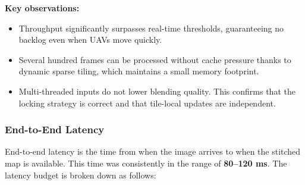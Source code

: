 \documentclass[conference]{IEEEtran}
\begin{document}
\begin{table}[h]
\centering
\caption{System Throughput Analysis}
\label{tab:throughput}
\end{table}

\noindent \textbf{Key observations:}
\begin{itemize}
    \item Throughput significantly surpasses real-time thresholds, guaranteeing no backlog even when UAVs move quickly.
    \item Several hundred frames can be processed without cache pressure thanks to dynamic sparse tiling, which maintains a small memory footprint.
    \item Multi-threaded inputs do not lower blending quality. This confirms that the locking strategy is correct and that tile-local updates are independent.
\end{itemize}

\subsubsection{End-to-End Latency}
End-to-end latency is the time from when the image arrives to when the stitched map is available. This time was consistently in the range of \textbf{80--120 ms}. The latency budget is broken down as follows:
\end{document}
